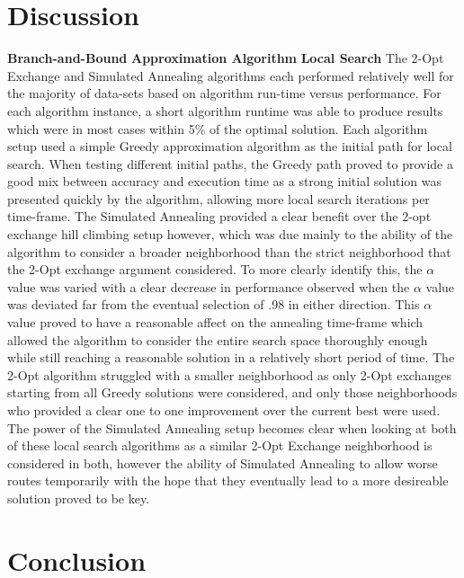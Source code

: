 \documentclass[format=sigconf]{acmart}
\begin{document}
\section*{Discussion}
\textbf{Branch-and-Bound}\newline
\textbf{Approximation Algorithm}\newline
\textbf{Local Search} The 2-Opt Exchange and Simulated Annealing algorithms each performed relatively 
well for the majority of data-sets based on algorithm run-time versus performance. For each algorithm instance, a short
algorithm runtime was able to produce results which were in most cases within 5\% of the optimal solution. Each algorithm setup 
used a simple Greedy approximation algorithm as the initial path for local search. When testing different initial paths, the Greedy path 
proved to provide a good mix between accuracy and execution time as a strong initial solution was presented quickly by the algorithm, allowing more local 
search iterations per time-frame. The Simulated Annealing 
provided a clear benefit over the 2-opt exchange hill climbing setup however, which was due mainly to the ability of the algorithm to consider 
a broader neighborhood than the strict neighborhood that the 2-Opt exchange argument considered. To more clearly identify this, the $\alpha$ value was 
varied with a clear decrease in performance observed when the $\alpha$ value was deviated far from the eventual selection of .98 in either direction. 
This $\alpha$ value proved to have a reasonable affect on the annealing time-frame which allowed the algorithm to consider the entire search space thoroughly enough 
while still reaching a reasonable solution in a relatively short period of time. The 2-Opt algorithm struggled with a smaller neighborhood as only 2-Opt exchanges starting from 
all Greedy solutions were considered, and only those neighborhoods who provided a clear one to one improvement over the current best were used. The power of the Simulated Annealing setup 
becomes clear when looking at both of these local search algorithms as a similar 2-Opt Exchange neighborhood is considered in both, however the ability of Simulated Annealing to 
allow worse routes temporarily with the hope that they eventually lead to a more desireable solution proved to be key.
\section*{Conclusion}


\end{document}
